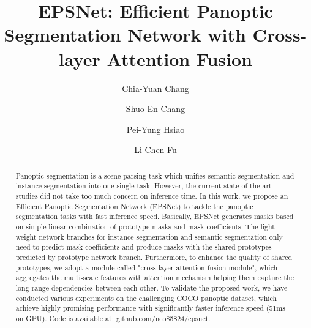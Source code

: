 \documentclass[runningheads]{llncs}
\begin{document}
\pagestyle{headings}
\mainmatter



\title{EPSNet: Efficient Panoptic Segmentation Network with Cross-layer Attention Fusion} 









\author{Chia-Yuan Chang \and
Shuo-En Chang \and
Pei-Yung Hsiao  \and
Li-Chen Fu 
}

\maketitle

\begin{abstract}
Panoptic segmentation is a scene parsing task which unifies semantic segmentation and instance segmentation into one single task. However, the current state-of-the-art studies did not take too much concern on inference time. In this work, we propose an Efficient Panoptic Segmentation Network  (EPSNet) to tackle the panoptic segmentation tasks with fast inference speed.  Basically, EPSNet generates masks based on simple linear combination of prototype masks and mask coefficients. The light-weight network branches for instance segmentation and semantic segmentation only need to predict mask coefficients and produce masks with the shared prototypes predicted by prototype network branch. Furthermore, to enhance the quality of shared prototypes, we adopt a module called "cross-layer attention fusion module", which aggregates the multi-scale features with attention mechanism helping them capture the long-range dependencies between each other.
To validate the proposed work, we have conducted various experiments on the challenging COCO panoptic dataset, which achieve highly promising performance with significantly faster inference speed (51ms on GPU). Code is available at: \url{github.com/neo85824/epsnet}.



\end{abstract}
\end{document}
